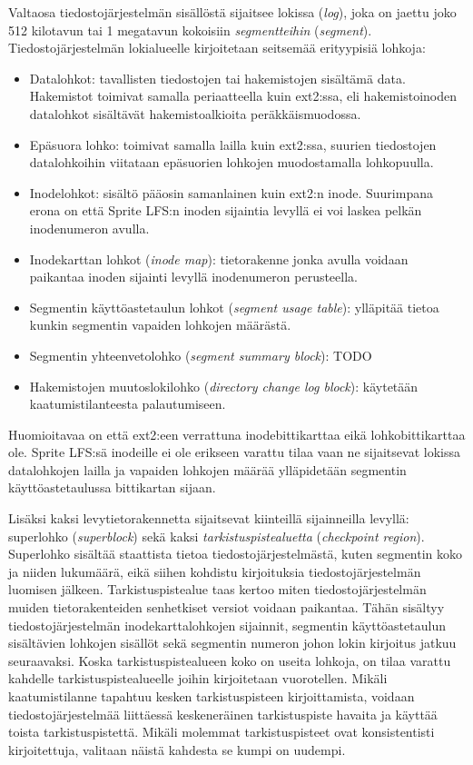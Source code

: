 Valtaosa tiedostojärjestelmän sisällöstä sijaitsee lokissa (\emph{log}), joka on jaettu joko 512 kilotavun tai 1 megatavun kokoisiin \emph{segmentteihin} (\emph{segment}).
Tiedostojärjestelmän lokialueelle kirjoitetaan seitsemää erityypisiä lohkoja:

\begin{itemize}
    \item{Datalohkot: tavallisten tiedostojen tai hakemistojen sisältämä data.
          Hakemistot toimivat samalla periaatteella kuin ext2:ssa, eli hakemistoinoden datalohkot sisältävät hakemistoalkioita peräkkäismuodossa.}
    \item{Epäsuora lohko: toimivat samalla lailla kuin ext2:ssa, suurien tiedostojen datalohkoihin viitataan epäsuorien lohkojen muodostamalla lohkopuulla.}
    \item{Inodelohkot: sisältö pääosin samanlainen kuin ext2:n inode. Suurimpana erona on että Sprite LFS:n inoden sijaintia levyllä ei voi laskea pelkän inodenumeron avulla.}
    \item{Inodekarttan lohkot (\emph{inode map}): tietorakenne jonka avulla voidaan paikantaa inoden sijainti levyllä inodenumeron perusteella.}
    \item{Segmentin käyttöastetaulun lohkot (\emph{segment usage table}): ylläpitää tietoa kunkin segmentin vapaiden lohkojen määrästä.}
    \item{Segmentin yhteenvetolohko (\emph{segment summary block}): TODO}
    \item{Hakemistojen muutoslokilohko (\emph{directory change log block}): käytetään kaatumistilanteesta palautumiseen.}
\end{itemize}
Huomioitavaa on että ext2:een verrattuna inodebittikarttaa eikä lohkobittikarttaa ole.
Sprite LFS:sä inodeille ei ole erikseen varattu tilaa vaan ne sijaitsevat lokissa datalohkojen lailla
ja vapaiden lohkojen määrää ylläpidetään segmentin käyttöastetaulussa bittikartan sijaan.

Lisäksi kaksi levytietorakennetta sijaitsevat kiinteillä sijainneilla levyllä: superlohko (\emph{superblock}) sekä kaksi \emph{tarkistuspistealuetta} (\emph{checkpoint region}).
Superlohko sisältää staattista tietoa tiedostojärjestelmästä,
kuten segmentin koko ja niiden lukumäärä, eikä siihen kohdistu kirjoituksia tiedostojärjestelmän luomisen jälkeen.
Tarkistuspistealue taas kertoo miten tiedostojärjestelmän muiden tietorakenteiden senhetkiset versiot voidaan paikantaa.
Tähän sisältyy tiedostojärjestelmän inodekarttalohkojen sijainnit, segmentin käyttöastetaulun sisältävien lohkojen sisällöt sekä segmentin numeron johon lokin kirjoitus jatkuu seuraavaksi.
Koska tarkistuspistealueen koko on useita lohkoja, on tilaa varattu kahdelle tarkistuspistealueelle joihin kirjoitetaan vuorotellen.
Mikäli kaatumistilanne tapahtuu kesken tarkistuspisteen kirjoittamista, voidaan tiedostojärjestelmää liittäessä keskeneräinen tarkistuspiste havaita ja käyttää toista tarkistuspistettä.
Mikäli molemmat tarkistuspisteet ovat konsistentisti kirjoitettuja, valitaan näistä kahdesta se kumpi on uudempi.

